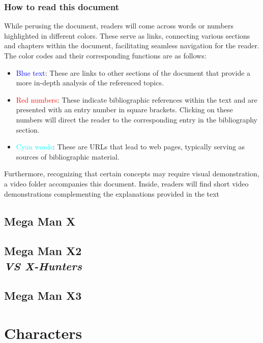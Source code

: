 \documentclass[openany]{report}
\begin{document}
	\section*{How to read this document}
	While perusing the document, readers will come across words or numbers highlighted in different colors. These serve as links, connecting various sections and chapters within the document, facilitating seamless navigation for the reader. The color codes and their corresponding functions are as follows:
	\begin{itemize}
		
	\item \textcolor{blue}{Blue text}: These are links to other sections of the document that provide a more in-depth analysis of the referenced topics.
	
	\item \textcolor{red}{Red numbers}: These indicate bibliographic references within the text and are presented with an entry number in square brackets. Clicking on these numbers will direct the reader to the corresponding entry in the bibliography section.
	
	\item \textcolor{cyan}{Cyan words}: These are URLs that lead to web pages, typically serving as sources of bibliographic material.
	\end{itemize}
	
	Furthermore, recognizing that certain concepts may require visual demonstration, a video folder accompanies this document. Inside, readers will find short video demonstrations complementing the explanations provided in the text
	
	
\chapter{Mega Man X}
\label{cha:X1}
%	

\chapter[Mega Man X2]{Mega Man X2\\[2ex]\Large\itshape{VS X-Hunters}}
\label{cha:X2}
%	
	
\chapter{Mega Man X3}
	\label{cha:X3}
	
\part{Characters}
\end{document}
